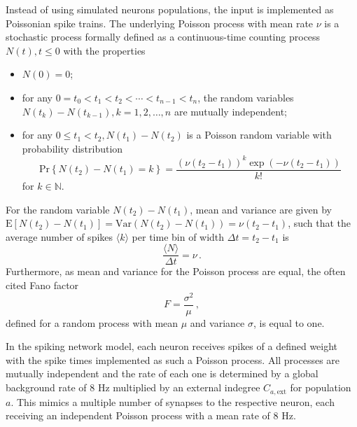 Instead of using simulated neurons populations, the input is implemented as Poissonian 
spike trains. The underlying Poisson process with mean rate $\nu$ is a stochastic process formally 
defined as a continuous-time counting process ${N(t), t \le 0}$ with the properties%
~\cite{tuckwell2005introduction}
\begin{itemize}
    \item $N(0) = 0$;
    \item for any $0 = t_0 < t_1 < t_2 < \cdots < t_{n-1} < t_n$, the random variables
        $N(t_k) - N(t_{k-1}), k = 1, 2, \dots, n$ are mutually independent; 
    \item for any $0 \le t_1 < t_2, N(t_1) - N(t_2)$ is a Poisson random variable with 
        probability distribution 
        \begin{equation}
            \text{Pr}\left\{N(t_2) - N(t_1) = k \right\} 
                = \frac{\left( \nu(t_2 - t_1) \right)^k \exp \left( - \nu(t_2 - t_1) \right) }{k!}
            \label{eq:poisson_process}
        \end{equation}
        for $k \in \mathbb{N}$.
\end{itemize}
For the random variable $N(t_2) - N(t_1)$, mean and variance are given by
$\text{E}[N(t_2) - N(t_1)] = \text{Var}(N(t_2) - N(t_1)) = \nu(t_2 - t_1)$,
such that the average number of spikes $\langle k \rangle$ 
per time bin of width $\Delta t = t_2 - t_1$ is 
\begin{equation}
    \frac{\langle{N}\rangle}{\Delta t} = \nu \,.
    \label{eq:poisson_rate}
\end{equation}
Furthermore, as mean and variance for the Poisson process are equal, the often cited 
Fano factor
\begin{equation}
    F = \frac{\sigma^2}{\mu}\,,
    \label{eq:Fano}
\end{equation}
defined for a random process with mean $\mu$ and variance $\sigma$, 
is equal to one. 

In the spiking network model, each neuron receives spikes of a defined weight with 
the spike times implemented as such a Poisson process. All processes are mutually independent 
and the rate of each one is determined by a global 
background rate of $8$ Hz multiplied by an external indegree $C_{a, \text{ext}}$ for
population $a$. 
This mimics a multiple number of synapses to the respective neuron, each receiving an 
independent Poisson process with a mean rate of $8$ Hz. 

